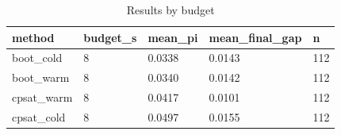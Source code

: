 \begin{table}[t]
\centering
\begin{tabular}{lllll}
\toprule
method & budget\_s & mean\_pi & mean\_final\_gap & n \\
\midrule
boot\_cold & 8 & 0.0338 & 0.0143 & 112 \\
boot\_warm & 8 & 0.0340 & 0.0142 & 112 \\
cpsat\_warm & 8 & 0.0417 & 0.0101 & 112 \\
cpsat\_cold & 8 & 0.0497 & 0.0155 & 112 \\
\bottomrule
\end{tabular}
\caption{Results by budget}
\label{tab:by-budget}
\end{table}

